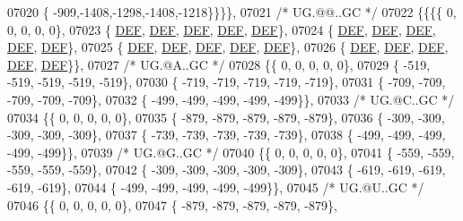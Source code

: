 \begin{DoxyCode}
07020 \{ -909,-1408,-1298,-1408,-1218\}\}\}\},
07021 \textcolor{comment}{/* UG.@@..GC */}
07022 \{\{\{\{    0,    0,    0,    0,    0\},
07023 \{  \mbox{\hyperlink{1_88_84__epars_8h_a397419fc12b37ed479c8abb9d444d843}{DEF}},  \mbox{\hyperlink{1_88_84__epars_8h_a397419fc12b37ed479c8abb9d444d843}{DEF}},  \mbox{\hyperlink{1_88_84__epars_8h_a397419fc12b37ed479c8abb9d444d843}{DEF}},  \mbox{\hyperlink{1_88_84__epars_8h_a397419fc12b37ed479c8abb9d444d843}{DEF}},  \mbox{\hyperlink{1_88_84__epars_8h_a397419fc12b37ed479c8abb9d444d843}{DEF}}\},
07024 \{  \mbox{\hyperlink{1_88_84__epars_8h_a397419fc12b37ed479c8abb9d444d843}{DEF}},  \mbox{\hyperlink{1_88_84__epars_8h_a397419fc12b37ed479c8abb9d444d843}{DEF}},  \mbox{\hyperlink{1_88_84__epars_8h_a397419fc12b37ed479c8abb9d444d843}{DEF}},  \mbox{\hyperlink{1_88_84__epars_8h_a397419fc12b37ed479c8abb9d444d843}{DEF}},  \mbox{\hyperlink{1_88_84__epars_8h_a397419fc12b37ed479c8abb9d444d843}{DEF}}\},
07025 \{  \mbox{\hyperlink{1_88_84__epars_8h_a397419fc12b37ed479c8abb9d444d843}{DEF}},  \mbox{\hyperlink{1_88_84__epars_8h_a397419fc12b37ed479c8abb9d444d843}{DEF}},  \mbox{\hyperlink{1_88_84__epars_8h_a397419fc12b37ed479c8abb9d444d843}{DEF}},  \mbox{\hyperlink{1_88_84__epars_8h_a397419fc12b37ed479c8abb9d444d843}{DEF}},  \mbox{\hyperlink{1_88_84__epars_8h_a397419fc12b37ed479c8abb9d444d843}{DEF}}\},
07026 \{  \mbox{\hyperlink{1_88_84__epars_8h_a397419fc12b37ed479c8abb9d444d843}{DEF}},  \mbox{\hyperlink{1_88_84__epars_8h_a397419fc12b37ed479c8abb9d444d843}{DEF}},  \mbox{\hyperlink{1_88_84__epars_8h_a397419fc12b37ed479c8abb9d444d843}{DEF}},  \mbox{\hyperlink{1_88_84__epars_8h_a397419fc12b37ed479c8abb9d444d843}{DEF}},  \mbox{\hyperlink{1_88_84__epars_8h_a397419fc12b37ed479c8abb9d444d843}{DEF}}\}\},
07027 \textcolor{comment}{/* UG.@A..GC */}
07028 \{\{    0,    0,    0,    0,    0\},
07029 \{ -519, -519, -519, -519, -519\},
07030 \{ -719, -719, -719, -719, -719\},
07031 \{ -709, -709, -709, -709, -709\},
07032 \{ -499, -499, -499, -499, -499\}\},
07033 \textcolor{comment}{/* UG.@C..GC */}
07034 \{\{    0,    0,    0,    0,    0\},
07035 \{ -879, -879, -879, -879, -879\},
07036 \{ -309, -309, -309, -309, -309\},
07037 \{ -739, -739, -739, -739, -739\},
07038 \{ -499, -499, -499, -499, -499\}\},
07039 \textcolor{comment}{/* UG.@G..GC */}
07040 \{\{    0,    0,    0,    0,    0\},
07041 \{ -559, -559, -559, -559, -559\},
07042 \{ -309, -309, -309, -309, -309\},
07043 \{ -619, -619, -619, -619, -619\},
07044 \{ -499, -499, -499, -499, -499\}\},
07045 \textcolor{comment}{/* UG.@U..GC */}
07046 \{\{    0,    0,    0,    0,    0\},
07047 \{ -879, -879, -879, -879, -879\},

\end{DoxyCode}
